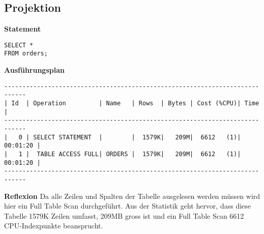 \documentclass[10pt]{article}
\begin{document}
\subsection{Projektion}
\textbf{Statement}
\begin{lstlisting}[style=sql]
SELECT *
FROM orders;
\end{lstlisting}
\textbf{Ausführungsplan}
\begin{lstlisting}[style=queryexecutionplan]
----------------------------------------------------------------------------                                                                                                                                                                                                                                 
| Id  | Operation         | Name   | Rows  | Bytes | Cost (%CPU)| Time     |                                                                                                                                                                                                                                 
----------------------------------------------------------------------------                                                                                                                                                                                                                                 
|   0 | SELECT STATEMENT  |        |  1579K|   209M|  6612   (1)| 00:01:20 |                                                                                                                                                                                                                                 
|   1 |  TABLE ACCESS FULL| ORDERS |  1579K|   209M|  6612   (1)| 00:01:20 |                                                                                                                                                                                                                                 
---------------------------------------------------------------------------- 
\end{lstlisting}   
\textbf{Reflexion} \newline
Da alle Zeilen und Spalten der Tabelle ausgelesen werden müssen wird hier ein
Full Table Scan durchgeführt. Aus der Statistik geht hervor, dass diese Tabelle
1579K Zeilen umfasst, 209MB gross ist und ein Full Table Scan 6612 CPU-Indexpunkte
beansprucht.
\end{document}
